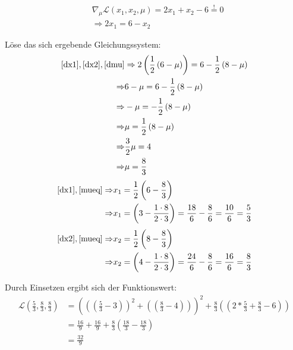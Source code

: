 \documentclass{article}
\begin{document}
\begin{equation}\label{dmu}
\begin{aligned}
    & \nabla_{\mu}\mathcal{L}(x_1,x_2,\mu) =2x_1+x_2-6 \overset{!}{=} 0 \\
& \Rightarrow 2x_1 = 6 - x_2
\end{aligned}
\end{equation}

Löse das sich ergebende Gleichungssystem:
\begin{equation}\label{mueq}
\begin{aligned}
    \eqref{dx1},\eqref{dx2},\eqref{dmu} &\Rightarrow 2\left( \frac{1}{2} \left(6 - \mu \right) \right) = 6 - \frac{1}{2} \left( 8-\mu \right)\\
    \Rightarrow & 6 - \mu  = 6 - \frac{1}{2} \left( 8-\mu \right)\\
    \Rightarrow &  - \mu  =  - \frac{1}{2} \left( 8-\mu \right)\\
    \Rightarrow &   \mu  =   \frac{1}{2} \left( 8-\mu \right)  \\
    \Rightarrow &   \frac{3}{2}\mu  =  4 \\
    \Rightarrow &   \mu  =  \frac{8}{3} \\
\end{aligned}
\end{equation}
\begin{equation}\label{x1eq}
\begin{aligned}
    \eqref{dx1},\eqref{mueq} \Rightarrow& x_1 = \frac{1}{2}\left(6-\frac{8}{3}\right)\\
    \Rightarrow & x_1 = \left(3-\frac{1 \cdot 8}{2\cdot 3}\right) = \frac{18}{6} -  \frac{8}{6} = \frac{10}{6} = \frac{5}{3}\\
\end{aligned}
\end{equation}
\begin{equation}\label{x2eq}
\begin{aligned}
    \eqref{dx2},\eqref{mueq} \Rightarrow& x_2 = \frac{1}{2}\left(8-\frac{8}{3}\right)\\
    \Rightarrow & x_2 = \left(4-\frac{1 \cdot 8}{2\cdot 3}\right) = \frac{24}{6} -  \frac{8}{6} = \frac{16}{6} = \frac{8}{3}\\
\end{aligned}
\end{equation}

Durch Einsetzen ergibt sich der Funktionswert:
\begin{equation}
\begin{aligned}
    \mathcal{L}\left(\frac{5}{3},\frac{8}{3},\frac{8}{3}\right) &=  \left(\left(\left(\frac{5}{3} - 3\right)\right)^2 + \left(\left(\frac{8}{3} -4\right)\right)\right)^2 + \frac{8}{3}\left(\left(2*\frac{5}{3} + \frac{8}{3} - 6 \right)\right)\\
    &=  \frac{16}{9} + \frac{16}{9} + \frac{8}{3} \left( \frac{18}{3} - \frac{18}{3} \right)\\
     &=  \frac{32}{9}
\end{aligned}
\end{equation}
\end{document}
